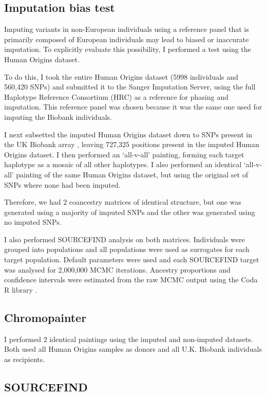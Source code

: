 \subsection{Imputation bias test}

Imputing variants in non-European individuals using a reference panel that is primarily composed of European individuals may lead to biased or inaccurate imputation. To explicitly evaluate this possibility, I performed a test using the Human Origins dataset.
 
To do this, I took the entire Human Origins dataset (5998 individuals and 560,420 SNPs) and submitted it to the Sanger Imputation Server, using the full Haplotype Reference Consortium (HRC) as a reference for phasing and imputation. This reference panel was chosen because it was the same one used for imputing the Biobank individuals.

I next subsetted the imputed Human Origins dataset down to SNPs present in the UK Biobank array , leaving 727,325 positions present in the imputed Human Origins dataset. I then performed an `all-v-all' painting, forming each target haplotype as a mosaic of all other haplotypes. I also performed an identical `all-v-all' painting of the same Human Origins dataset, but using the original set of SNPs where none had been imputed. 

Therefore, we had 2 coancestry matrices of identical structure, but one was generated using a majority of imputed SNPs and the other was generated using no imputed SNPs. 

I also performed SOURCEFIND analysis on both matrices. Individuals were grouped into populations and all populations were used as surrogates for each target population. Default parameters were used and each SOURCEFIND target was analysed for 2,000,000 MCMC iterations. Ancestry proportions and confidence intervals were estimated from the raw MCMC output using the Coda R library \cite{oro22547}.

\subsection{Chromopainter}

I performed 2 identical paintings using the imputed and non-imputed datasets. Both used all Human Origins samples as donors and all U.K. Biobank individuals as recipients. 

\subsection{SOURCEFIND}

